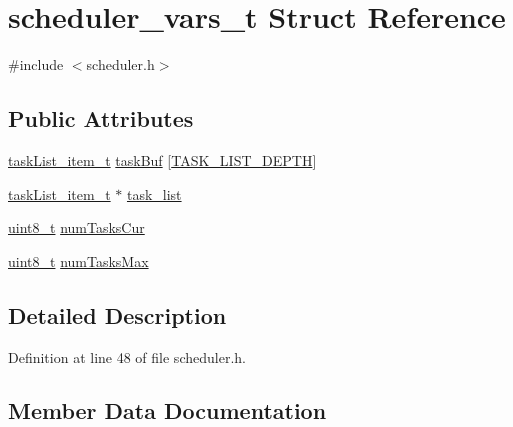 \hypertarget{structscheduler__vars__t}{}\section{scheduler\+\_\+vars\+\_\+t Struct Reference}
\label{structscheduler__vars__t}


{\ttfamily \#include $<$scheduler.\+h$>$}

\subsection*{Public Attributes}
\begin{DoxyCompactItemize}
\item 
\hyperlink{group___scheduler_ga35a54119c3c60da01e15fb98e49f582b}{task\+List\+\_\+item\+\_\+t} \hyperlink{structscheduler__vars__t_a2e0fbcb73c0b0dcf626505eb0f7afab5}{task\+Buf} \mbox{[}\hyperlink{group___scheduler_gaab36173783d65a27ad398a411d01bf98}{T\+A\+S\+K\+\_\+\+L\+I\+S\+T\+\_\+\+D\+E\+P\+TH}\mbox{]}
\item 
\hyperlink{group___scheduler_ga35a54119c3c60da01e15fb98e49f582b}{task\+List\+\_\+item\+\_\+t} $\ast$ \hyperlink{structscheduler__vars__t_ac11491c1035581debc6a9572d257cd35}{task\+\_\+list}
\item 
\hyperlink{_p_e___types_8h_aba7bc1797add20fe3efdf37ced1182c5}{uint8\+\_\+t} \hyperlink{structscheduler__vars__t_a5847653bd49ad9fcd6474f5ab43b8440}{num\+Tasks\+Cur}
\item 
\hyperlink{_p_e___types_8h_aba7bc1797add20fe3efdf37ced1182c5}{uint8\+\_\+t} \hyperlink{structscheduler__vars__t_ad2a68894b5c8d2ca6199fc6201429d6d}{num\+Tasks\+Max}
\end{DoxyCompactItemize}


\subsection{Detailed Description}


Definition at line 48 of file scheduler.\+h.



\subsection{Member Data Documentation}
